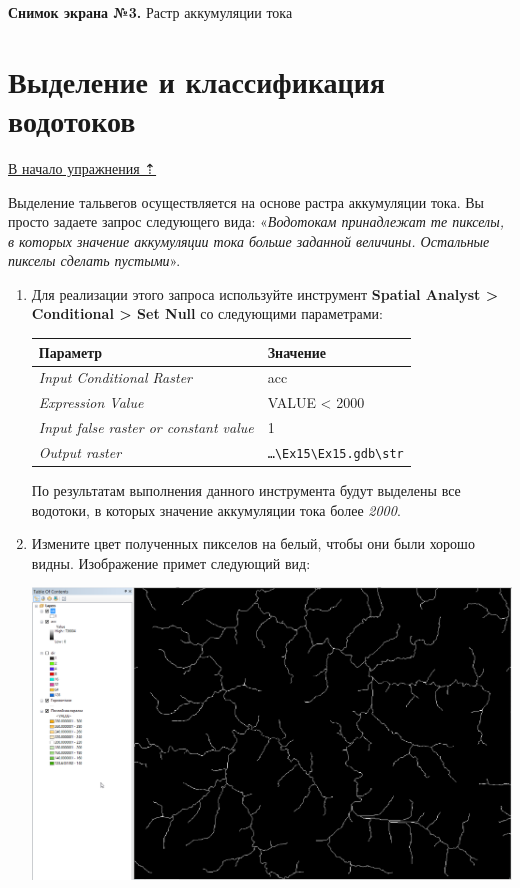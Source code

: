 \documentclass[12pt,]{book}
\begin{document}
\textbf{Снимок экрана №3.} Растр аккумуляции тока

\hypertarget{dem-classify}{%
\section{Выделение и классификация водотоков}\label{dem-classify}}

\protect\hyperlink{dem}{В начало упражнения ⇡}

Выделение тальвегов осуществляется на основе растра аккумуляции тока. Вы просто задаете запрос следующего вида: «\emph{Водотокам принадлежат те пикселы, в которых значение аккумуляции тока больше заданной величины. Остальные пикселы сделать пустыми}».

\begin{enumerate}
\def\labelenumi{\arabic{enumi}.}
\item
  Для реализации этого запроса используйте инструмент \textbf{Spatial Analyst \textgreater{} Conditional \textgreater{} Set Null} со следующими параметрами:

  \begin{longtable}[]{@{}ll@{}}
  \toprule
  Параметр & Значение\tabularnewline
  \midrule
  \endhead
  \emph{Input Conditional Raster} & acc\tabularnewline
  \emph{Expression Value} & VALUE \textless{} 2000\tabularnewline
  \emph{Input false raster or constant value} & 1\tabularnewline
  \emph{Output raster} & \texttt{\ldots{}\textbackslash{}Ex15\textbackslash{}Ex15.gdb\textbackslash{}str}\tabularnewline
  \bottomrule
  \end{longtable}

  По результатам выполнения данного инструмента будут выделены все водотоки, в которых значение аккумуляции тока более \emph{2000}.
\item
  Измените цвет полученных пикселов на белый, чтобы они были хорошо видны. Изображение примет следующий вид:

  \includegraphics{images/Ex15/image14.png}


\end{enumerate}
\end{document}
